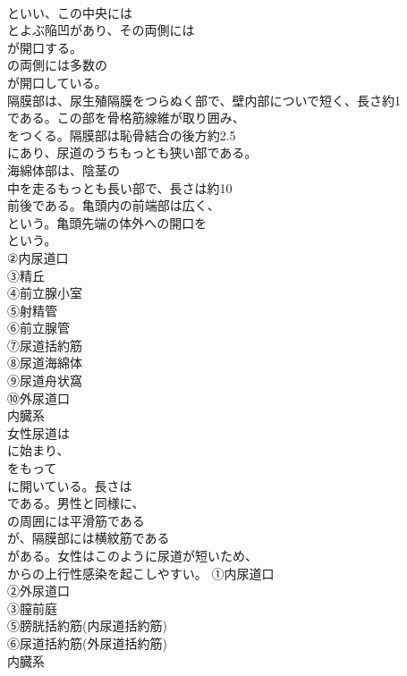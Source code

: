 \documentclass[8pt]{extreport}
\begin{document}
\begin{CJK}{UTF8}{min}
\\	といい、この中央には
\\	とよぶ陥凹があり、その両側には
\\	が開口する。
\\	の両側には多数の
\\	が開口している。
\\	隔膜部は、尿生殖隔膜をつらぬく部で、壁内部についで短く、長さ約1
\\	である。この部を骨格筋線維が取り囲み、
\\	をつくる。隔膜部は恥骨結合の後方約2.5
\\	にあり、尿道のうちもっとも狭い部である。
\\	海綿体部は、陰茎の
\\	中を走るもっとも長い部で、長さは約10
\\	前後である。亀頭内の前端部は広く、
\\	という。亀頭先端の体外への開口を
\\	という。	
\\	②内尿道口
\\	③精丘
\\	④前立腺小室
\\	⑤射精管
\\	⑥前立腺管
\\	⑦尿道括約筋
\\	⑧尿道海綿体
\\	⑨尿道舟状窩
\\	⑩外尿道口
\\	内臓系
\\	女性尿道は
\\	に始まり、
\\	をもって
\\	に開いている。長さは
\\	である。男性と同様に、
\\	の周囲には平滑筋である
\\	が、隔膜部には横紋筋である
\\	がある。女性はこのように尿道が短いため、
\\	からの上行性感染を起こしやすい。	①内尿道口
\\	②外尿道口
\\	③膣前庭
\\	⑤膀胱括約筋(内尿道括約筋)
\\	⑥尿道括約筋(外尿道括約筋)
\\	内臓系
\end{CJK}
\end{document}
